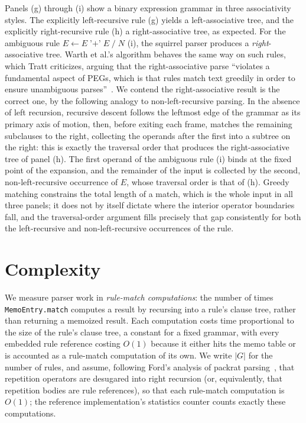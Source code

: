 \documentclass[manuscript]{acmart}
\newcommand{\cd}[1]{\texttt{#1}}
\begin{document}
Panels (g) through (i) show a binary expression grammar in three associativity styles. The explicitly left-recursive rule (g) yields a left-associative tree, and the explicitly right-recursive rule (h) a right-associative tree, as expected. For the ambiguous rule $E \leftarrow E \; \texttt{'+'} \; E \; / \; N$ (i), the squirrel parser produces a \emph{right}-associative tree. Warth et al.'s algorithm behaves the same way on such rules, which Tratt criticizes, arguing that the right-associative parse ``violates a fundamental aspect of PEGs, which is that rules match text greedily in order to ensure unambiguous parses''~\cite{tratt2010}. We contend the right-associative result is the correct one, by the following analogy to non-left-recursive parsing. In the absence of left recursion, recursive descent follows the leftmost edge of the grammar as its primary axis of motion, then, before exiting each frame, matches the remaining subclauses to the right, collecting the operands after the first into a subtree on the right: this is exactly the traversal order that produces the right-associative tree of panel (h). The first operand of the ambiguous rule (i) binds at the fixed point of the expansion, and the remainder of the input is collected by the second, non-left-recursive occurrence of $E$, whose traversal order is that of (h). Greedy matching constrains the total length of a match, which is the whole input in all three panels; it does not by itself dictate where the interior operator boundaries fall, and the traversal-order argument fills precisely that gap consistently for both the left-recursive and non-left-recursive occurrences of the rule.

\section{Complexity}
\label{sec:complexity}

We measure parser work in \emph{rule-match computations}: the number of times \cd{MemoEntry.match} computes a result by recursing into a rule's clause tree, rather than returning a memoized result. Each computation costs time proportional to the size of the rule's clause tree, a constant for a fixed grammar, with every embedded rule reference costing $O(1)$ because it either hits the memo table or is accounted as a rule-match computation of its own. We write $|G|$ for the number of rules, and assume, following Ford's analysis of packrat parsing~\cite{ford2002}, that repetition operators are desugared into right recursion (or, equivalently, that repetition bodies are rule references), so that each rule-match computation is $O(1)$; the reference implementation's statistics counter counts exactly these computations.
\end{document}
